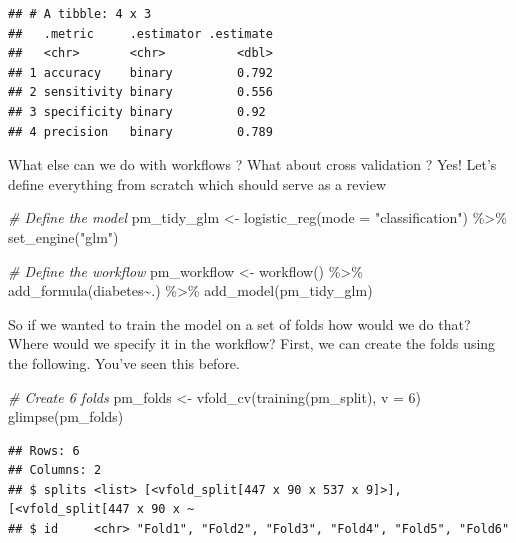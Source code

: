 \documentclass[
]{article}
\newenvironment{Shaded}{\begin{snugshade}}{\end{snugshade}}
\newcommand{\AttributeTok}[1]{\textcolor[rgb]{0.77,0.63,0.00}{#1}}
\newcommand{\CommentTok}[1]{\textcolor[rgb]{0.56,0.35,0.01}{\textit{#1}}}
\newcommand{\DecValTok}[1]{\textcolor[rgb]{0.00,0.00,0.81}{#1}}
\newcommand{\FunctionTok}[1]{\textcolor[rgb]{0.00,0.00,0.00}{#1}}
\newcommand{\NormalTok}[1]{#1}
\newcommand{\OtherTok}[1]{\textcolor[rgb]{0.56,0.35,0.01}{#1}}
\newcommand{\SpecialCharTok}[1]{\textcolor[rgb]{0.00,0.00,0.00}{#1}}
\newcommand{\StringTok}[1]{\textcolor[rgb]{0.31,0.60,0.02}{#1}}
\begin{document}
\begin{verbatim}
## # A tibble: 4 x 3
##   .metric     .estimator .estimate
##   <chr>       <chr>          <dbl>
## 1 accuracy    binary         0.792
## 2 sensitivity binary         0.556
## 3 specificity binary         0.92 
## 4 precision   binary         0.789
\end{verbatim}

What else can we do with workflows ? What about cross validation ? Yes!
Let's define everything from scratch which should serve as a review

\begin{Shaded}
\begin{Highlighting}[]
\CommentTok{\# Define the model}
\NormalTok{pm\_tidy\_glm }\OtherTok{\textless{}{-}} \FunctionTok{logistic\_reg}\NormalTok{(}\AttributeTok{mode =} \StringTok{"classification"}\NormalTok{) }\SpecialCharTok{\%\textgreater{}\%}
  \FunctionTok{set\_engine}\NormalTok{(}\StringTok{"glm"}\NormalTok{) }

\CommentTok{\# Define the workflow}
\NormalTok{pm\_workflow }\OtherTok{\textless{}{-}} \FunctionTok{workflow}\NormalTok{() }\SpecialCharTok{\%\textgreater{}\%}
  \FunctionTok{add\_formula}\NormalTok{(diabetes}\SpecialCharTok{\textasciitilde{}}\NormalTok{.) }\SpecialCharTok{\%\textgreater{}\%} 
  \FunctionTok{add\_model}\NormalTok{(pm\_tidy\_glm)}
\end{Highlighting}
\end{Shaded}

So if we wanted to train the model on a set of folds how would we do
that? Where would we specify it in the workflow? First, we can create
the folds using the following. You've seen this before.

\begin{Shaded}
\begin{Highlighting}[]
\CommentTok{\# Create 6 folds}
\NormalTok{pm\_folds }\OtherTok{\textless{}{-}} \FunctionTok{vfold\_cv}\NormalTok{(}\FunctionTok{training}\NormalTok{(pm\_split), }\AttributeTok{v =} \DecValTok{6}\NormalTok{)}
\FunctionTok{glimpse}\NormalTok{(pm\_folds)}
\end{Highlighting}
\end{Shaded}

\begin{verbatim}
## Rows: 6
## Columns: 2
## $ splits <list> [<vfold_split[447 x 90 x 537 x 9]>], [<vfold_split[447 x 90 x ~
## $ id     <chr> "Fold1", "Fold2", "Fold3", "Fold4", "Fold5", "Fold6"
\end{verbatim}
\end{document}
